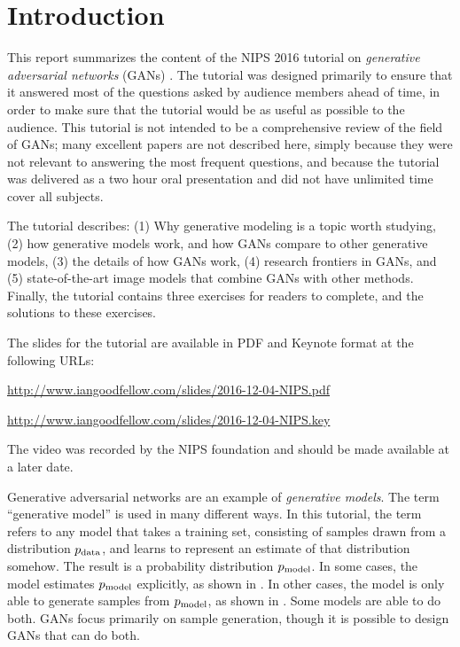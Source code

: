 \section*{Introduction}

This report summarizes the content of the NIPS 2016 tutorial on {\em generative adversarial networks}
(GANs) \citep{Goodfellow-et-al-NIPS2014-small}.
The tutorial was designed primarily to ensure that it answered most of
the questions asked by audience members ahead of time, in order to make sure
that the tutorial would be as useful as possible to the audience.
This tutorial is not intended to be a comprehensive review of the field
of GANs; many excellent papers are not described here, simply because
they were not relevant to answering the most frequent questions, and because
the tutorial was delivered as a two hour oral presentation and did not
have unlimited time cover all subjects.

The tutorial describes:
(1) Why generative modeling is a topic worth studying,
(2) how generative models work, and how GANs compare to other generative models,
(3) the details of how GANs work,
(4) research frontiers in GANs, and
(5) state-of-the-art image models that combine GANs with other methods.
Finally, the tutorial contains three exercises for readers to complete,
and the solutions to these exercises.

The slides for the tutorial are available in PDF and Keynote format at the following URLs:

\url{http://www.iangoodfellow.com/slides/2016-12-04-NIPS.pdf}

\url{http://www.iangoodfellow.com/slides/2016-12-04-NIPS.key}

The video was recorded by the NIPS foundation and should be made available at a later date.

Generative adversarial networks are an example of {\em generative models}.
The term ``generative model'' is used in many different ways.
In this tutorial, the term refers to any model that takes a training set,
consisting of samples drawn from a distribution $p_{\rm{data}}$, and learns to
represent an estimate of that distribution somehow.
The result is a probability distribution $p_{\rm{model}}$.
In some cases, the model estimates $p_{\rm{model}}$ explicitly, as shown in
.
In other cases, the model is only able to generate samples from
$p_{\rm{model}}$, as shown in .
Some models are able to do both.
GANs focus primarily on sample generation, though it is possible to
design GANs that can do both.

